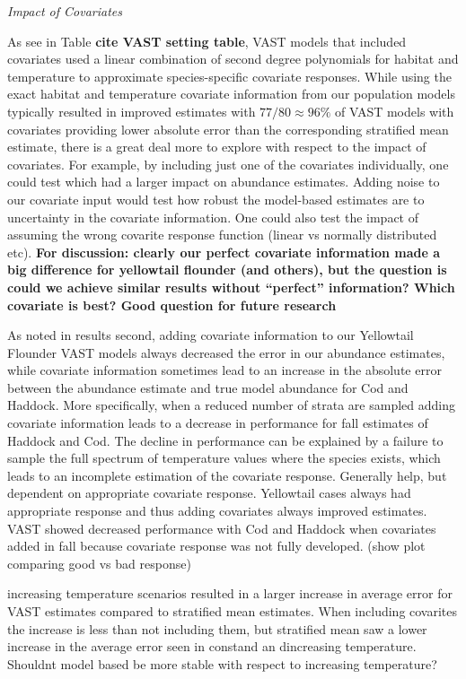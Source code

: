 \documentclass[
  12pt,
]{article}
\begin{document}
\emph{Impact of Covariates}

As see in Table \textbf{cite VAST setting table}, VAST models that included covariates used a linear combination of second degree polynomials for habitat and temperature to approximate species-specific covariate responses. While using the exact habitat and temperature covariate information from our population models typically resulted in improved estimates with \(77/80\approx 96\%\) of VAST models with covariates providing lower absolute error than the corresponding stratified mean estimate, there is a great deal more to explore with respect to the impact of covariates. For example, by including just one of the covariates individually, one could test which had a larger impact on abundance estimates. Adding noise to our covariate input would test how robust the model-based estimates are to uncertainty in the covariate information. One could also test the impact of assuming the wrong covarite response function (linear vs normally distributed etc).
\textbf{For discussion: clearly our perfect covariate information made a big difference for yellowtail flounder (and others), but the question is could we achieve similar results without ``perfect'' information? Which covariate is best? Good question for future research}

As noted in results second, adding covariate information to our Yellowtail Flounder VAST models always decreased the error in our abundance estimates, while covariate information sometimes lead to an increase in the absolute error between the abundance estimate and true model abundance for Cod and Haddock. More specifically, when a reduced number of strata are sampled adding covariate information leads to a decrease in performance for fall estimates of Haddock and Cod. The decline in performance can be explained by a failure to sample the full spectrum of temperature values where the species exists, which leads to an incomplete estimation of the covariate response.
Generally help, but dependent on appropriate covariate response. Yellowtail cases always had appropriate response and thus adding covariates always improved estimates. VAST showed decreased performance with Cod and Haddock when covariates added in fall because covariate response was not fully developed. (show plot comparing good vs bad response)

increasing temperature scenarios resulted in a larger increase in average error for VAST estimates compared to stratified mean estimates. When including covarites the increase is less than not including them, but stratified mean saw a lower increase in the average error seen in constand an dincreasing temperature. Shouldnt model based be more stable with respect to increasing temperature?
\end{document}
